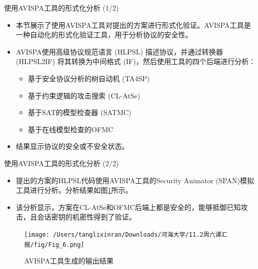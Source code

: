 \documentclass{beamer}
\begin{document}
\begin{frame}{使用AVISPA工具的形式化分析 (1/2)}
    \begin{itemize}
        \item 本节展示了使用AVISPA工具对提出的方案进行形式化验证。AVISPA工具是一种自动化的形式化验证工具，用于分析协议的安全性。
        \item AVISPA使用高级协议规范语言 (HLPSL) 描述协议，并通过转换器 (HLPSL2IF) 将其转换为中间格式 (IF)，然后使用工具的四个后端进行分析：
        \begin{itemize}
            \item 基于安全协议分析的树自动机 (TA4SP)
            \item 基于约束逻辑的攻击搜索 (CL-AtSe)
            \item 基于SAT的模型检查器 (SATMC)
            \item 基于在线模型检查的OFMC
        \end{itemize}
        \item 结果显示协议的安全或不安全状态。
    \end{itemize}
\end{frame}

\begin{frame}{使用AVISPA工具的形式化分析 (2/2)}
    \begin{itemize}
        \item 提出的方案的HLPSL代码使用AVISPA工具的Security Animator (SPAN)模拟工具进行分析。分析结果如图\ref{Fig_6}所示。
        \item 该分析显示，方案在CL-AtSe和OFMC后端上都是安全的，能够抵御已知攻击，且会话密钥的机密性得到了验证。
    \end{itemize}

    \begin{figure}
        \centering
        \texttt{[image: /Users/tanglixinran/Downloads/河海大学/11.2周六课汇报/fig/Fig\_6.png]} %
        \caption{AVISPA工具生成的输出结果}
        \label{Fig_6}
    \end{figure}
\end{frame}
\end{document}
